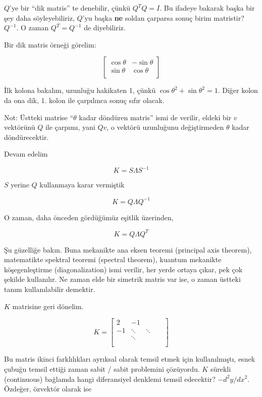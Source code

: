 \documentclass[12pt,fleqn]{article}\usepackage{../../common}
\begin{document}
$Q$'ye bir ``dik matris'' te denebilir, çünkü $Q^TQ = I$. Bu ifadeye
bakarak başka bir şey daha söyleyebiliriz, $Q$'yu başka \textbf{ne} soldan
çarparsa sonuç birim matristir? $Q^{-1}$. O zaman $Q^T = Q^{-1}$ de
diyebiliriz.

Bir dik matris örneği görelim:

$$ 
\left[\begin{array}{cc}
\cos \theta & -\sin \theta \\
\sin \theta & \cos \theta \\
\end{array}\right]
 $$

İlk kolona bakalım, uzunluğu hakikaten 1, çünkü $\cos \theta ^2 + \sin \theta
^2 = 1$. Diğer kolon da ona dik, 1. kolon ile çarpılınca sonuç sıfır olacak. 

Not: Üstteki matrise ``$\theta$ kadar döndüren matris'' ismi de verilir,
eldeki bir $v$ vektörünü $Q$ ile çarpımı, yani $Qv$, o vektörü uzunluğunu
değiştirmeden $\theta$ kadar döndürecektir.

Devam edelim

$$ K = S \Lambda S^{-1} $$

$S$ yerine $Q$ kullanmaya karar vermiştik

$$  K = Q \Lambda Q^{-1} $$

O zaman, daha önceden gördüğümüz eşitlik üzerinden, 

$$  K = Q \Lambda Q^{T} $$

Şu güzelliğe bakın. Buna mekanikte ana eksen teoremi (principal axis theorem),
matematikte spektral teoremi (spectral theorem), kuantum mekanikte
köşegenleştirme (diagonalization) ismi verilir, her yerde ortaya çıkar, pek çok
şekilde kullanılır. Ne zaman elde bir simetrik matris var ise, o zaman üstteki
tanım kullanılabilir demektir.

$K$ matrisine geri dönelim. 

$$ 
K =
\left[\begin{array}{rrrrr}
2 & -1 &&& \\
-1 & \ddots & \ddots && \\
& \ddots &&& \\
&&&& \\
&&&& 
\end{array}\right]
 $$

Bu matris ikinci farklılıkları ayrıksal olarak temsil etmek için
kullanılmıştı, esnek çubuğu temsil ettiği zaman sabit / sabit problemini
çözüyordu. $K$ sürekli (continuous) bağlamda hangi diferansiyel
denklemi temsil edecektir? $-d^2y/dx^2$.  Özdeğer, özvektör olarak ise
\end{document}
